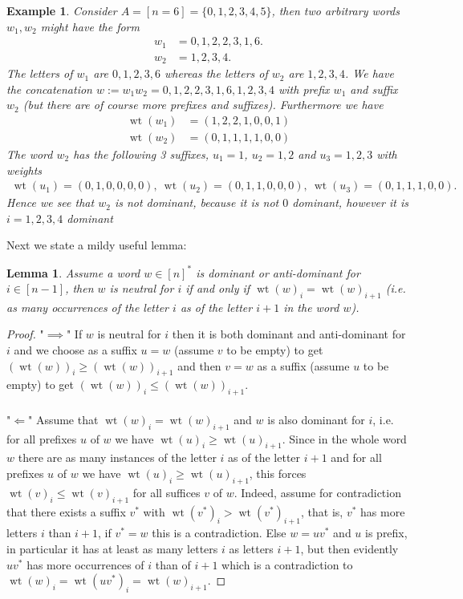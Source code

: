 \documentclass{article}
\newtheorem{lem}{Lemma}
\newtheorem{exmp}{Example}
\DeclareMathOperator{\wt}{wt}
\begin{document}
\begin{exmp}
Consider $A=[n=6]=\{0,1,2,3,4,5\}$, then two arbitrary words $w_1,w_2$ might have the form 
\begin{align*}
    w_1 &= 0,1,2,2,3,1,6. \\
    w_2 &= 1,2,3,4.
\end{align*}
The letters of $w_1$ are $0,1,2,3,6$ whereas the letters of $w_2$ are $1,2,3,4$. We have the concatenation $w:=w_1w_2=0,1,2,2,3,1,6,1,2,3,4$ with prefix $w_1$ and suffix $w_2$ (but there are of course more prefixes and suffixes). Furthermore we have 
\begin{align*}
    \wt(w_1)&=(1,2,2,1,0,0,1) \\
    \wt(w_2)&=(0,1,1,1,1,0,0)
\end{align*}
The word $w_2$ has the following 3 suffixes, $u_1=1$, $u_2=1,2$ and $u_3=1,2,3$ with weights 
\begin{align*}
    \wt(u_1)=(0,1,0,0,0,0), \ \wt(u_2)=(0,1,1,0,0,0), \ \wt(u_3)=(0,1,1,1,0,0).
\end{align*}
Hence we see that $w_2$ is not dominant, because it is not $0$ dominant, however it is $i=1,2,3,4$ dominant
\end{exmp}
Next we state a mildy useful lemma:
\begin{lem}
Assume a word $w \in [n]^*$ is dominant or anti-dominant for $i \in [n-1]$, then $w$ is neutral for $i$ if and only if $\wt(w)_i = \wt(w)_{i+1}$ (i.e. as many occurrences of the letter $i$ as of the letter $i+1$ in the word $w$). 
\end{lem}
\begin{proof}
"$\implies$" If $w$ is neutral for $i$ then it is both dominant and anti-dominant for $i$ and we choose as a suffix $u=w$ (assume $v$ to be empty) to get $(\wt(w))_i \geq (\wt(w))_{i+1}$ and then $v=w$ as a suffix (assume $u$ to be empty) to get $( \wt(w))_i \leq (\wt(w))_{i+1}$. 
\\\\
"$\Longleftarrow$" Assume that $\wt(w)_i = \wt(w)_{i+1}$ and $w$ is also dominant for $i$, i.e. for all prefixes $u$ of $w$ we have $\wt(u)_i \geq \wt(u)_{i+1}$. Since in the whole word $w$ there are as many instances of the letter $i$ as of the letter $i+1$ and for all prefixes $u$ of $w$ we have $\wt(u)_i \geq \wt(u)_{i+1}$, this forces $\wt(v)_i \leq \wt(v)_{i+1}$ for all suffices $v$ of $w$. Indeed, assume for contradiction that there exists a suffix $v^*$ with $\wt(v^*)_i > \wt(v^*)_{i+1}$, that is, $v^*$ has more letters $i$ than $i+1$, if $v^*=w$ this is a contradiction. Else $w=uv^*$ and $u$ is prefix, in particular it has at least as many letters $i$ as letters $i+1$, but then evidently $uv^*$ has more occurrences of $i$ than of $i+1$ which is a contradiction to $\wt(w)_i=\wt(uv^*)_i=\wt(w)_{i+1}$.
\end{proof}
\end{document}
